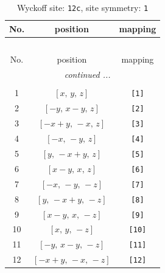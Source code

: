 \documentclass[fleqn,8pt]{jsarticle}
\begin{document}
\begin{longtable}{ccc}
\caption{Wyckoff site: {\tt 12c}, site symmetry: {\tt 1}}
 \\
 \hline \hline
No. & position & mapping \\ \hline \endfirsthead

\multicolumn{2}{l}{\tablename\ \thetable{}} \\
 \hline \hline
No. & position & mapping \\ \hline \endhead

 \hline \hline
\multicolumn{2}{r}{\footnotesize\it continued ...} \\ \endfoot

 \hline \hline
\multicolumn{2}{r}{} \\ \endlastfoot

1 & $\left[ x,\, y,\, z \right]$ & {\tt [1]} \\ \hline
2 & $\left[ - y,\, x - y,\, z \right]$ & {\tt [2]} \\ \hline
3 & $\left[ - x + y,\, - x,\, z \right]$ & {\tt [3]} \\ \hline
4 & $\left[ - x,\, - y,\, z \right]$ & {\tt [4]} \\ \hline
5 & $\left[ y,\, - x + y,\, z \right]$ & {\tt [5]} \\ \hline
6 & $\left[ x - y,\, x,\, z \right]$ & {\tt [6]} \\ \hline
7 & $\left[ - x,\, - y,\, - z \right]$ & {\tt [7]} \\ \hline
8 & $\left[ y,\, - x + y,\, - z \right]$ & {\tt [8]} \\ \hline
9 & $\left[ x - y,\, x,\, - z \right]$ & {\tt [9]} \\ \hline
10 & $\left[ x,\, y,\, - z \right]$ & {\tt [10]} \\ \hline
11 & $\left[ - y,\, x - y,\, - z \right]$ & {\tt [11]} \\ \hline
12 & $\left[ - x + y,\, - x,\, - z \right]$ & {\tt [12]} \\
\end{longtable}
\end{document}
